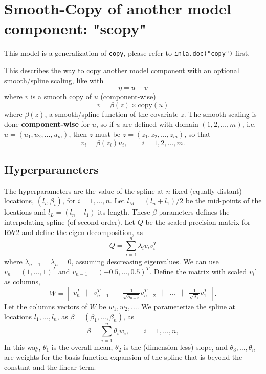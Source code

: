 \documentclass[a4paper,11pt]{article}
\begin{document}
\section*{Smooth-Copy of another model component: "scopy"}

This model is a generalization of \texttt{copy}, please refer to
\texttt{inla.doc("copy")} first.

This describes the way to copy another model component with an
optional smooth/spline scaling, like with
\begin{displaymath}
    \eta = u + v
\end{displaymath}
where $v$ is a smooth copy of $u$ (component-wise)
\begin{displaymath}
    v = \beta(z)\times\text{copy}(u)
\end{displaymath}
where $\beta(z)$, a smooth/spline function of the covariate $z$. The
smooth scaling is done \textbf{component-wise} for $u$, so if $u$ are
defined with domain $(1, 2, \ldots, m)$, i.e.\
$u=(u_1, u_2, \ldots, u_m)$, then $z$ must be
$z=(z_1, z_2, \ldots, z_m)$, so that
\begin{displaymath}
    v_i = \beta(z_i) u_i, \qquad i=1, 2, \ldots, m.
\end{displaymath}

\subsection*{Hyperparameters}

The hyperparameters are the value of the spline at $n$ fixed (equally
distant) locations, $(l_i, \beta_i)$, for $i=1, \ldots, n$. Let
$l_M = (l_n+l_1)/2$ be the mid-points of the locations and
$l_L=(l_n-l_1)$ its length. These $\beta$-parameters defines the
interpolating spline (of second order). Let $Q$ be the
scaled-precision matrix for RW2 and define the eigen decomposition, as
\begin{displaymath}
    Q = \sum_{i=1}^{n} \lambda_i v_i v_i^{T}
\end{displaymath}
where $\lambda_{n-1}=\lambda_{n}=0$, assuming descreasing eigenvalues.
We can use $v_{n} = (1, \ldots, 1)^{T}$ and
$v_{n-1} = (-0.5, \ldots, 0.5)^{T}$.
Define the matrix with scaled $v_i$' as columns,
\begin{displaymath}
    W = \begin{bmatrix}
          v_{n}^{T} &|& v_{n-1}^{T} &|&  \frac{1}{\sqrt{\lambda_{n-2}}} v^{T}_{n-2} &|& \ldots &|& \frac{1}{\sqrt{\lambda_{1}}} v^{T}_{1}
        \end{bmatrix}.
\end{displaymath}
Let the columns vectors of $W$ be $w_1, w_2, \ldots$. 
We parameterize the spline at locations $l_1, \ldots, l_n$, as
$\beta=(\beta_1, \ldots, \beta_n)$, as
\begin{displaymath}
    \beta = \sum_{i=1}^{n} \theta_i w_i, \qquad i=1, \ldots, n,
\end{displaymath}
In this way, $\theta_1$ is the overall mean, $\theta_2$ is the
(dimension-less) slope, and $\theta_{3}, \ldots, \theta_n$ are weights
for the basis-function expansion of the spline that is beyond the
constant and the linear term.
\end{document}
